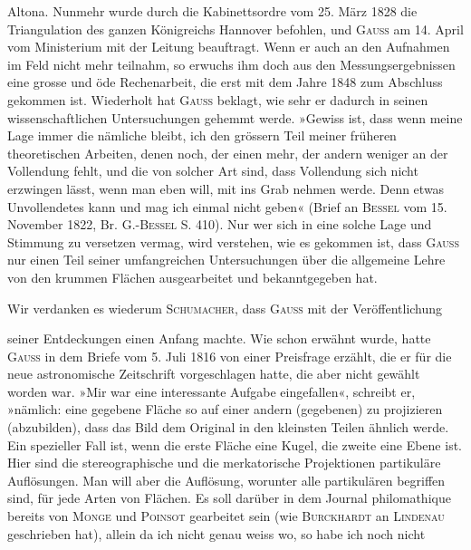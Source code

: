 Altona. Nunmehr wurde durch die Kabinettsordre vom 25. März 1828 die
Triangulation des ganzen Königreichs Hannover befohlen, und \textsc{Gauss} am
14. April vom Ministerium mit der Leitung beauftragt. Wenn er auch an
den Aufnahmen im Feld nicht mehr teilnahm, so erwuchs ihm doch aus den
Messungsergebnissen eine grosse und öde Rechenarbeit, die erst mit dem
Jahre 1848 zum Abschluss gekommen ist. Wiederholt hat \textsc{Gauss} beklagt,
wie sehr er dadurch in seinen wissenschaftlichen Untersuchungen gehemmt
werde. »Gewiss ist, dass wenn meine Lage immer die nämliche bleibt, ich
den grössern Teil meiner früheren theoretischen Arbeiten, denen noch, der
einen mehr, der andern weniger an der Vollendung fehlt, und die von solcher
Art sind, dass Vollendung sich nicht erzwingen lässt, wenn man eben will,
mit ins Grab nehmen werde. Denn etwas Unvollendetes kann und mag ich
einmal nicht geben« (Brief an \textsc{Bessel} vom 15. November 1822, Br. G.-\textsc{Bessel}
S. 410). Nur wer sich in eine solche Lage und Stimmung zu versetzen vermag,
wird verstehen, wie es gekommen ist, dass \textsc{Gauss} nur einen Teil seiner
umfangreichen Untersuchungen über die allgemeine Lehre von den krummen
Flächen ausgearbeitet und bekanntgegeben hat.
\par
Wir verdanken es wiederum \textsc{Schumacher}, dass \textsc{Gauss} mit der Veröffentlichung
\par\smallskip{}\par
\clearpage{}\setcounter{footnote}{0}
\noindent seiner Entdeckungen einen Anfang machte. Wie schon erwähnt
wurde, hatte \textsc{Gauss} in dem Briefe vom 5. Juli 1816 von einer Preisfrage erzählt,
die er für die neue astronomische Zeitschrift vorgeschlagen hatte, die
aber nicht gewählt worden war. »Mir war eine interessante Aufgabe eingefallen«,
schreibt er, »nämlich:  eine gegebene Fläche so auf einer
andern (gegebenen) zu projizieren (abzubilden), dass das Bild dem Original in
den kleinsten Teilen ähnlich werde. Ein spezieller Fall ist, wenn die erste
Fläche eine Kugel, die zweite eine Ebene ist. Hier sind die stereographische
und die merkatorische Projektionen partikuläre Auflösungen. Man will aber
die  Auflösung, worunter alle partikulären begriffen sind, für
jede Arten von Flächen. Es soll darüber in dem Journal philomathique bereits
von \textsc{Monge} und \textsc{Poinsot} gearbeitet sein (wie \textsc{Burckhardt} an \textsc{Lindenau}
geschrieben hat), allein da ich nicht genau weiss wo, so habe ich noch nicht
